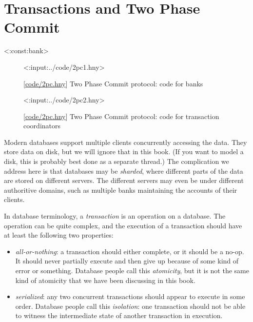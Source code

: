 \documentclass{report}
\newcommand{\harmonylink}[1]{%
[\href{https://harmony.cs.cornell.edu/#1}{\underline{#1}}]%
}
\newenvironment{code}{
\tcolorbox
}{
\endtcolorbox
}
\begin{document}
{\chapter{Transactions and Two Phase Commit}
\label{ch:2pc}

<{:const:bank}>

\begin{figure}
\begin{code}
<{:input:../code/2pc1.hny}>
\end{code}
\caption{\harmonylink{code/2pc.hny} Two Phase Commit protocol: code for banks}
\label{fig:2pc1}
\end{figure}

\begin{figure}
\begin{code}
<{:input:../code/2pc2.hny}>
\end{code}
\caption{\harmonylink{code/2pc.hny} Two Phase Commit protocol: code for transaction coordinators}
\label{fig:2pc2}
\end{figure}

Modern databases support multiple clients concurrently accessing the data.
They store data on disk, but we will ignore that in this book.
(If you want to model a disk, this is probably best done as a separate
thread.)
The complication we address here is that databases may be \emph{sharded},
where different parts of the data are stored on different servers.
The different servers may even be under different
authoritive domains, such as multiple banks maintaining the accounts of their
clients.

In database terminology, a \emph{transaction} is an operation on a database.
The operation can be quite complex, and the execution of a transaction
should have at least the following two properties:
\begin{itemize}
\item \emph{all-or-nothing}: a transaction should either complete, or it should
be a no-op.  It should never partially execute and then give up because of
some kind of error or something.  Database
people call this \emph{atomicity}, but it is not the same kind of atomicity that
we have been discussing in this book.
\item \emph{serialized}: any two concurrent transactions should appear to
execute in some order.  Database people call this \emph{isolation}: one transaction
should not be able to witness the intermediate state of another transaction
in execution.
\end{itemize}

}
\end{document}
